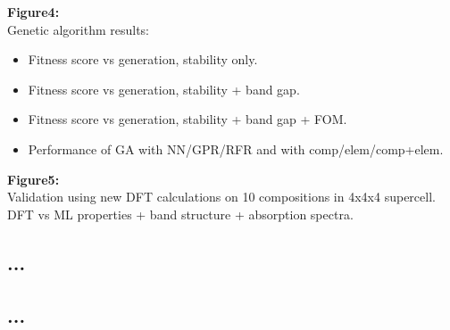 \documentclass[]{revtex4-2}
\begin{document}
\textbf{Figure4:} \\
Genetic algorithm results: 
\begin{itemize}
\item Fitness score vs generation, stability only.
\item Fitness score vs generation, stability + band gap.
\item Fitness score vs generation, stability + band gap + FOM.
\item Performance of GA with NN/GPR/RFR and with comp/elem/comp+elem. \\
\end{itemize}

\textbf{Figure5:} \\
Validation using new DFT calculations on 10 compositions in 4x4x4 supercell. DFT vs ML properties + band structure + absorption spectra. \\


\subsection*{...}

\subsection*{...}
\end{document}
